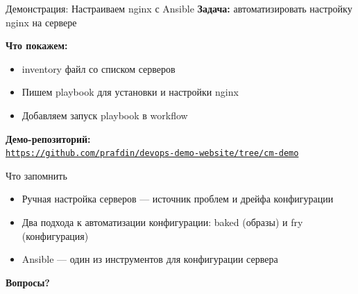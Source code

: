 \documentclass[aspectratio=169]{beamer}
\begin{document}
    \begin{frame}{Демонстрация: Настраиваем nginx с Ansible}
        \textbf{Задача:} автоматизировать настройку nginx на сервере
        
        \vspace{0.3cm}
        
        \textbf{Что покажем:}
        \begin{itemize}
            \item inventory файл со списком серверов
            \item Пишем playbook для установки и настройки nginx
            \item Добавляем запуск playbook в workflow
        \end{itemize}

        \vspace{0.2cm}
        \textbf{Демо-репозиторий:} \\
        \href{https://github.com/prafdin/devops-demo-website/tree/cm-demo}{\texttt{https://github.com/prafdin/devops-demo-website/tree/cm-demo}}
    \end{frame}

    \begin{frame}{Что запомнить}
        \begin{itemize}
            \item Ручная настройка серверов — источник проблем и дрейфа конфигурации
            \item Два подхода к автоматизации конфигурации: baked (образы) и fry (конфигурация)
            \item Ansible — один из инструментов для конфигурации сервера
        \end{itemize}

        \vspace{0.5cm}

        \begin{center}
            \textbf{Вопросы?}
        \end{center}
    \end{frame}
\end{document}
